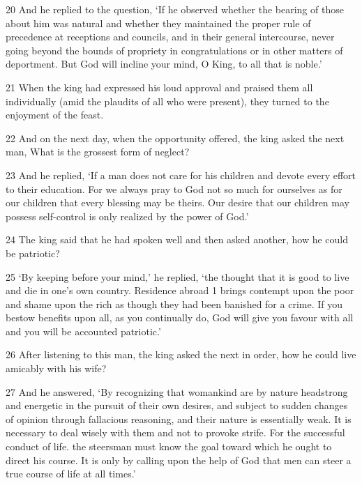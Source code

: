 \par 20 And he replied to the question, ‘If he observed whether the bearing of those about him was natural and whether they maintained the proper rule of precedence at receptions and councils, and in their general intercourse, never going beyond the bounds of propriety in congratulations or in other matters of deportment. But God will incline your mind, O King, to all that is noble.’

\par 21 When the king had expressed his loud approval and praised them all individually (amid the plaudits of all who were present), they turned to the enjoyment of the feast.

\par 22 And on the next day, when the opportunity offered, the king asked the next man, What is the grossest form of neglect?

\par 23 And he replied, ‘If a man does not care for his children and devote every effort to their education. For we always pray to God not so much for ourselves as for our children that every blessing may be theirs. Our desire that our children may possess self-control is only realized by the power of God.’

\par 24 The king said that he had spoken well and then asked another, how he could be patriotic?

\par 25 ‘By keeping before your mind,’ he replied, ‘the thought that it is good to live and die in one's own country. Residence abroad 1 brings contempt upon the poor and shame upon the rich as though they had been banished for a crime. If you bestow benefits upon all, as you continually do, God will give you favour with all and you will be accounted patriotic.’

\par 26 After listening to this man, the king asked the next in order, how he could live amicably with his wife?

\par 27 And he answered, ‘By recognizing that womankind are by nature headstrong and energetic in the pursuit of their own desires, and subject to sudden changes of opinion through fallacious reasoning, and their nature is essentially weak. It is necessary to deal wisely with them and not to provoke strife. For the successful conduct of life. the steersman must know the goal toward which he ought to direct his course. It is only by calling upon the help of God that men can steer a true course of life at all times.’

